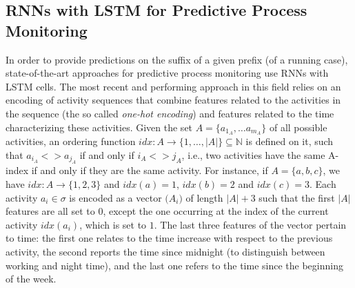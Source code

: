\subsection{RNNs with LSTM for Predictive Process Monitoring}
\label{subsec:RNNforpredictive}
In order to provide predictions on the suffix of a given prefix (of a running case), state-of-the-art approaches for predictive process monitoring use RNNs with LSTM cells.  The most recent and performing approach in this field \cite{niek96732} relies on an encoding of activity sequences that combine features related to the activities in the sequence (the so called \textit{one-hot encoding}) and features related to the time characterizing these activities. Given the set $A = \{a_{1_A}, \ldots a_{m_A}\}$ of all possible activities, an ordering function $idx:A \rightarrow \{1, \ldots, \left|A\right| \} \subseteq \mathbb{N}$ is defined on it, such that $a_{i_A}<>a_{j_A}$ if and only if $i_A<>j_A$, i.e., two activities have the same A-index if and only if they are the same activity. For instance, if $A=\{a,b,c\}$, we have $idx: A \rightarrow \{1,2,3\}$ and $idx(a)=1$, $idx(b)=2$ and $idx(c)=3$. Each activity $a_i \in \sigma$ is encoded as a vector $\mathbb(A_i)$ of length $|A|+3$ such that the first $|A|$ features are all set to $0$, except the one occurring at the index of the current activity $idx(a_i)$, which is set to $1$. The last three features of the vector pertain to time: the first one relates to the time increase with respect to the previous activity, the second reports the time since midnight (to distinguish between working and night time), and the last one refers to the time since the beginning of the week.

